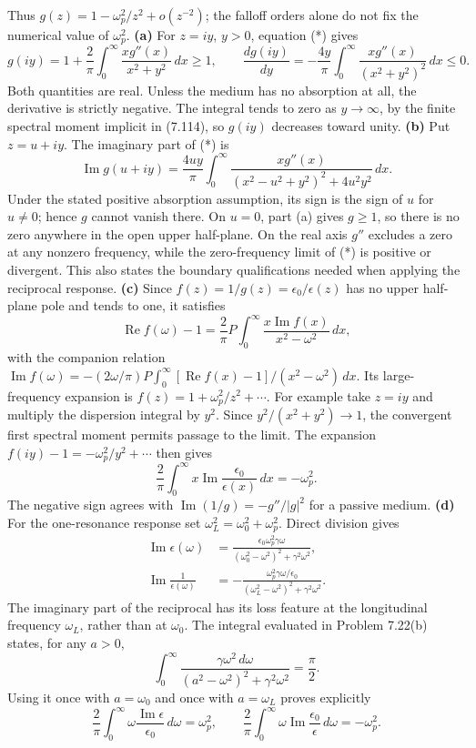 Thus $g(z)=1-\omega_p^2/z^2+o(z^{-2})$; the falloff orders alone
do not fix the numerical value of $\omega_p^2$.
\textbf{(a)} For $z=iy$, $y>0$, equation (*) gives
\[
g(iy)=1+\frac2\pi\int_0^\infty\frac{xg''(x)}{x^2+y^2}\,dx\geq1,
\qquad
\frac{d g(iy)}{dy}=-\frac{4y}\pi\int_0^\infty
\frac{xg''(x)}{(x^2+y^2)^2}\,dx\leq0.
\]
Both quantities are real. Unless the medium has no absorption at
all, the derivative is strictly negative. The integral tends to
zero as $y\to\infty$, by the finite spectral moment implicit in
(7.114), so $g(iy)$ decreases toward unity.
\textbf{(b)} Put $z=u+iy$. The imaginary part of (*) is
\[
\operatorname{Im}g(u+iy)=\frac{4uy}\pi\int_0^\infty
\frac{xg''(x)}{(x^2-u^2+y^2)^2+4u^2y^2}\,dx.
\]
Under the stated positive absorption assumption, its sign is the
sign of $u$ for $u\ne0$; hence $g$ cannot vanish there. On $u=0$,
part (a) gives $g\geq1$, so there is no zero anywhere in the open
upper half-plane. On the real axis $g''$ excludes a zero at any
nonzero frequency, while the zero-frequency limit of (*) is positive
or divergent. This also states the boundary qualifications needed
when applying the reciprocal response.
\textbf{(c)} Since $f(z)=1/g(z)=\epsilon_0/\epsilon(z)$ has no upper
half-plane pole and tends to one, it satisfies
\[
\boxed{\operatorname{Re}f(\omega)-1
=\frac2\pi P\int_0^\infty\frac{x\operatorname{Im}f(x)}{x^2-\omega^2}\,dx,}
\]
with the companion relation
$\operatorname{Im}f(\omega)=-(2\omega/\pi)P\int_0^\infty
[\operatorname{Re}f(x)-1]/(x^2-\omega^2)\,dx$.
Its large-frequency expansion is $f(z)=1+\omega_p^2/z^2+\cdots$.
For example take $z=iy$ and multiply the dispersion integral by
$y^2$.  Since $y^2/(x^2+y^2)\to1$, the convergent first spectral
moment permits passage to the limit.  The expansion
$f(iy)-1=-\omega_p^2/y^2+\cdots$ then gives
\[
\boxed{\frac2\pi\int_0^\infty x\operatorname{Im}
\frac{\epsilon_0}{\epsilon(x)}\,dx=-\omega_p^2.}
\]
The negative sign agrees with
$\operatorname{Im}(1/g)=-g''/|g|^2$ for a passive medium.
\textbf{(d)} For the one-resonance response set
$\omega_L^2=\omega_0^2+\omega_p^2$. Direct division gives
\begin{align*}
\operatorname{Im}\epsilon(\omega)
&=\frac{\epsilon_0\omega_p^2\gamma\omega}
{(\omega_0^2-\omega^2)^2+\gamma^2\omega^2},\\
\operatorname{Im}\frac1{\epsilon(\omega)}
&=-\frac{\omega_p^2\gamma\omega/\epsilon_0}
{(\omega_L^2-\omega^2)^2+\gamma^2\omega^2}.
\end{align*}
The imaginary part of the reciprocal has its loss feature at the
longitudinal frequency $\omega_L$, rather than at $\omega_0$.
The integral evaluated in Problem 7.22(b) states, for any $a>0$,
\[
\int_0^\infty\frac{\gamma\omega^2\,d\omega}
{(a^2-\omega^2)^2+\gamma^2\omega^2}=\frac\pi2.
\]
Using it once with $a=\omega_0$ and once with $a=\omega_L$ proves
explicitly
\[
\frac2\pi\int_0^\infty\omega\frac{\operatorname{Im}\epsilon}{\epsilon_0}
\,d\omega=\omega_p^2,\qquad
\frac2\pi\int_0^\infty\omega\operatorname{Im}\frac{\epsilon_0}{\epsilon}
\,d\omega=-\omega_p^2.
\]

